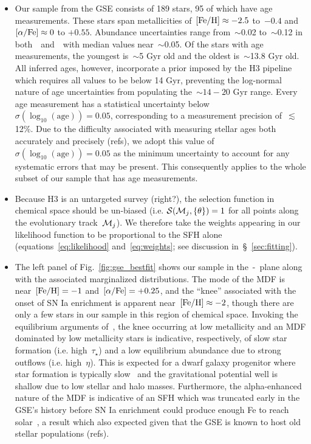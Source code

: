 \documentclass[ms.tex]{subfiles}
\begin{document}
\begin{itemize}

	\item Our sample from the GSE consists of 189 stars, 95 of which have
	age measurements.
	These stars span metallicities of~$\text{[Fe/H]} \approx -2.5$ to~$-0.4$ and
	$\text{[$\alpha$/Fe]} \approx 0$ to $+0.55$.
	Abundance uncertainties range from~$\sim$0.02 to~$\sim$0.12 in
	both~\feh~and~\afe~with median values near~$\sim$0.05.
	Of the stars with age measurements, the youngest is~$\sim$5 Gyr old and the
	oldest is~$\sim$13.8 Gyr old.
	All inferred ages, however, incorporate a prior imposed by the H3 pipeline
	which requires all values to be below 14 Gyr, preventing the log-normal
	nature of age uncertainties from populating the~$\sim14 - 20$ Gyr range.
	Every age measurement has a statistical uncertainty below
	$\sigma(\log_{10}(\text{age})) = 0.05$, corresponding to a measurement
	precision of~$\lesssim$12\%.
	Due to the difficulty associated with measuring stellar ages both
	accurately and precisely (refs), we adopt this value of
	$\sigma(\log_{10}(\text{age})) = 0.05$ as the minimum uncertainty to
	account for any systematic errors that may be present.
	This consequently applies to the whole subset of our sample that has age
	measurements.

	\item Because H3 is an untargeted survey {\color{red} (right?)}, the
	selection function in chemical space should be un-biased (i.e.
	$\mathcal{S}(\mathcal{M}_j,\{\theta\}) = 1$ for all points along the
	evolutionary track~$\mathcal{M}_j$).
	We therefore take the weights appearing in our likelihood function to be
	proportional to the SFH alone (equations~\ref{eq:likelihood}
	and~\ref{eq:weights}; see discussion in~\S~\ref{sec:fitting}).

	\item The left panel of Fig.~\ref{fig:gse_bestfit} shows our sample in
	the~\afe-\feh~plane along with the associated marginalized distributions.
	The mode of the MDF is near~$\text{[Fe/H]} = -1$ and~$\text{[$\alpha$/Fe]} = +0.25$, and the
	``knee'' associated with the onset of SN Ia enrichment is apparent
	near~$\text{[Fe/H]} \approx -2$, though there are only a few stars in our sample
	in this region of chemical space.
	Invoking the equilibrium arguments of~\citet{Weinberg2017}, the knee
	occurring at low metallicity and an MDF dominated by low metallicity stars
	is indicative, respectively, of slow star formation (i.e. high~$\tau_\star$)
	and a low equilibrium abundance due to strong outflows (i.e. high~$\eta$).
	This is expected for a dwarf galaxy progenitor where star formation is
	typically slow~\citep[e.g.][]{Hudson2015} and the gravitational potential
	well is shallow due to low stellar and halo masses.
	Furthermore, the alpha-enhanced nature of the MDF is indicative of an SFH
	which was truncated early in the GSE's history before SN Ia enrichment
	could produce enough Fe to reach solar~\afe, a result which also expected
	given that the GSE is known to host old stellar populations (refs).


\end{itemize}
\end{document}

